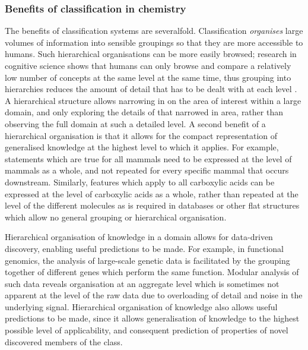 \documentclass[10pt]{bmc_article}
\newenvironment{bmcformat}{\baselineskip20pt\sloppy\setboolean{publ}{false}}{\baselineskip20pt\sloppy}
\begin{document}
\begin{bmcformat}
\subsubsection*{Benefits of classification in chemistry}
The benefits of classification systems are severalfold. Classification \textit{organises} large volumes of information into sensible groupings so that they are more accessible to humans. Such hierarchical organisations can be more easily browsed; research in cognitive science shows that humans can only browse and compare a relatively low number of concepts at the same level at the same time, thus grouping into hierarchies reduces the amount of detail that has to be dealt with at each level \cite{sternberg2003}. A hierarchical structure allows narrowing in on the area of interest within a large domain, and only exploring the details of that narrowed in area, rather than observing the full domain at such a detailed level. A second benefit of a hierarchical organisation is that it allows for the compact representation of generalised knowledge at the highest level to which it applies.  For example, statements which are true for all mammals need to be expressed at the level of mammals as a whole, and not repeated for every specific mammal that occurs downstream.  Similarly, features which apply to all carboxylic acids can be expressed at the level of carboxylic acids as a whole, rather than repeated at the level of the different molecules as is required in databases or other flat structures which allow no general grouping or hierarchical organisation. 

Hierarchical organisation of knowledge in a domain allows for data-driven discovery, enabling useful predictions to be made.  For example, in functional genomics, the analysis of large-scale genetic data is facilitated by the grouping together of different genes which perform the same function. Modular analysis of such data reveals organisation at an aggregate level which is sometimes not apparent at the level of the raw data due to overloading of detail and noise in the underlying signal. %
Hierarchical organisation of knowledge also allows useful predictions to be made, since it allows generalisation of knowledge to the highest possible level of applicability, and consequent prediction of properties of novel discovered members of the class.  


\end{bmcformat}
\end{document}

